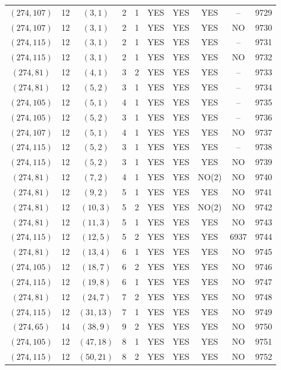 \begin{longtable}{|c|c|c|c|c|c|c|c|c|c|}
$(274, 107)$ & 12 & $(3, 1)$ & 2 & 1 & YES & YES & YES & -- & 9729\\
$(274, 107)$ & 12 & $(3, 1)$ & 2 & 1 & YES & YES & YES & NO & 9730\\
$(274, 115)$ & 12 & $(3, 1)$ & 2 & 1 & YES & YES & YES & -- & 9731\\
$(274, 115)$ & 12 & $(3, 1)$ & 2 & 1 & YES & YES & YES & NO & 9732\\
$(274, 81)$ & 12 & $(4, 1)$ & 3 & 2 & YES & YES & YES & -- & 9733\\
$(274, 81)$ & 12 & $(5, 2)$ & 3 & 1 & YES & YES & YES & -- & 9734\\
$(274, 105)$ & 12 & $(5, 1)$ & 4 & 1 & YES & YES & YES & -- & 9735\\
$(274, 105)$ & 12 & $(5, 2)$ & 3 & 1 & YES & YES & YES & -- & 9736\\
$(274, 107)$ & 12 & $(5, 1)$ & 4 & 1 & YES & YES & YES & NO & 9737\\
$(274, 115)$ & 12 & $(5, 2)$ & 3 & 1 & YES & YES & YES & -- & 9738\\
$(274, 115)$ & 12 & $(5, 2)$ & 3 & 1 & YES & YES & YES & NO & 9739\\
$(274, 81)$ & 12 & $(7, 2)$ & 4 & 1 & YES & YES & NO(2) & NO & 9740\\
$(274, 81)$ & 12 & $(9, 2)$ & 5 & 1 & YES & YES & YES & NO & 9741\\
$(274, 81)$ & 12 & $(10, 3)$ & 5 & 2 & YES & YES & NO(2) & NO & 9742\\
$(274, 81)$ & 12 & $(11, 3)$ & 5 & 1 & YES & YES & YES & NO & 9743\\
$(274, 115)$ & 12 & $(12, 5)$ & 5 & 2 & YES & YES & YES & 6937 & 9744\\
$(274, 81)$ & 12 & $(13, 4)$ & 6 & 1 & YES & YES & YES & NO & 9745\\
$(274, 105)$ & 12 & $(18, 7)$ & 6 & 2 & YES & YES & YES & NO & 9746\\
$(274, 115)$ & 12 & $(19, 8)$ & 6 & 1 & YES & YES & YES & NO & 9747\\
$(274, 81)$ & 12 & $(24, 7)$ & 7 & 2 & YES & YES & YES & NO & 9748\\
$(274, 115)$ & 12 & $(31, 13)$ & 7 & 1 & YES & YES & YES & NO & 9749\\
$(274, 65)$ & 14 & $(38, 9)$ & 9 & 2 & YES & YES & YES & NO & 9750\\
$(274, 105)$ & 12 & $(47, 18)$ & 8 & 1 & YES & YES & YES & NO & 9751\\
$(274, 115)$ & 12 & $(50, 21)$ & 8 & 2 & YES & YES & YES & NO & 9752\\

\end{longtable}

